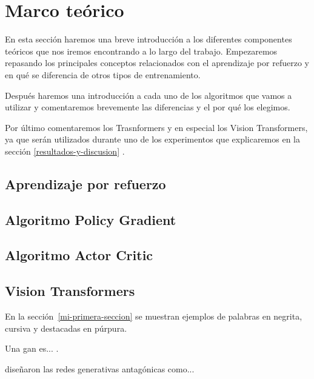 \section{Marco teórico}

En esta sección haremos una breve introducción a los diferentes componentes teóricos que nos iremos encontrando a lo largo del trabajo. Empezaremos repasando los principales conceptos relacionados con el aprendizaje por refuerzo y en qué se diferencia de otros tipos de entrenamiento. 

Después haremos una introducción a cada uno de los algoritmos que vamos a utilizar y comentaremos brevemente las diferencias y el por qué los elegimos.

Por último comentaremos los Trasnformers y en especial los Vision Transformers, ya que serán utilizados durante uno de los experimentos que explicaremos en la sección \ref{resultados-y-discusion} .
\subsection{Aprendizaje por refuerzo}
\label{aprendizaje-por-refuerzo}

\subsection{Algoritmo Policy Gradient}
\label{algoritmo-policy-gradient}

\subsection{Algoritmo Actor Critic}
\label{algoritmo-actor-critic}

\subsection{Vision Transformers}
\label{vision-transformers}


En la sección~\ref{mi-primera-seccion} se muestran ejemplos de palabras en negrita, cursiva y destacadas en púrpura.
\medskip

Una \acrfull{gan} es... \citep{goodfellow2014generative}.
\medskip

\citet{goodfellow2014generative} diseñaron las redes generativas antagónicas como...
\medskip

\vspace{5ex}

